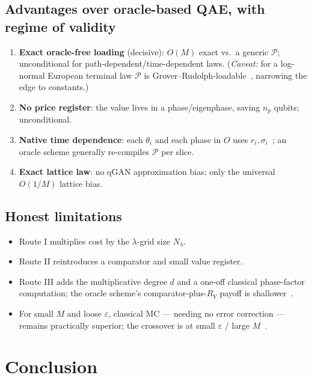 \documentclass[11pt]{article}
\begin{document}
\subsection{Advantages over oracle-based QAE, with regime of validity}
\begin{enumerate}
    \item \textbf{Exact oracle-free loading} (decisive): $O(M)$ exact vs.\ a generic $\mathcal{P}$; unconditional for path-dependent/time-dependent laws. (\emph{Caveat:} for a log-normal European terminal law $\mathcal{P}$ is Grover--Rudolph-loadable~\cite{grover2002creating}, narrowing the edge to constants.)
    \item \textbf{No price register}: the value lives in a phase/eigenphase, saving $n_p$ qubits; unconditional.
    \item \textbf{Native time dependence}: each $\theta_i$ and each phase in $O$ uses $r_i,\sigma_i$~\cite{Kim_2017}; an oracle scheme generally re-compiles $\mathcal{P}$ per slice.
    \item \textbf{Exact lattice law}: no qGAN approximation bias; only the universal $O(1/M)$ lattice bias.
\end{enumerate}

\subsection{Honest limitations}
\begin{itemize}
    \item Route I multiplies cost by the $\lambda$-grid size $N_\lambda$.
    \item Route II reintroduces a comparator and small value register.
    \item Route III adds the multiplicative degree $d$ and a one-off classical phase-factor computation; the oracle scheme's comparator-plus-$R_Y$ payoff is shallower~\cite{woerner2019riskanalysis}.
    \item For small $M$ and loose $\varepsilon$, classical MC --- needing no error correction --- remains practically superior; the crossover is at small $\varepsilon$ / large $M$~\cite{chakrabarti2021threshold}.
\end{itemize}

\section{Conclusion}
\end{document}
